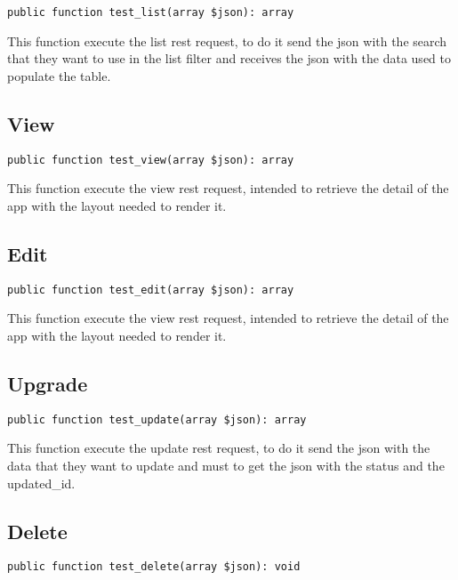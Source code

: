 \documentclass[a4paper]{book}
\begin{document}
\begin{lstlisting}
public function test_list(array $json): array
\end{lstlisting}

This function execute the list rest request, to do it send the json with
the search that they want to use in the list filter and receives the json
with the data used to populate the table.

\hypertarget{toc62}{}
\subsection{View}

\begin{lstlisting}
public function test_view(array $json): array
\end{lstlisting}

This function execute the view rest request, intended to retrieve the detail
of the app with the layout needed to render it.

\hypertarget{toc63}{}
\subsection{Edit}

\begin{lstlisting}
public function test_edit(array $json): array
\end{lstlisting}

This function execute the view rest request, intended to retrieve the detail
of the app with the layout needed to render it.

\hypertarget{toc64}{}
\subsection{Upgrade}

\begin{lstlisting}
public function test_update(array $json): array
\end{lstlisting}

This function execute the update rest request, to do it send the json with
the data that they want to update and must to get the json with the status
and the updated\_id.

\hypertarget{toc65}{}
\subsection{Delete}

\begin{lstlisting}
public function test_delete(array $json): void
\end{lstlisting}
\end{document}
